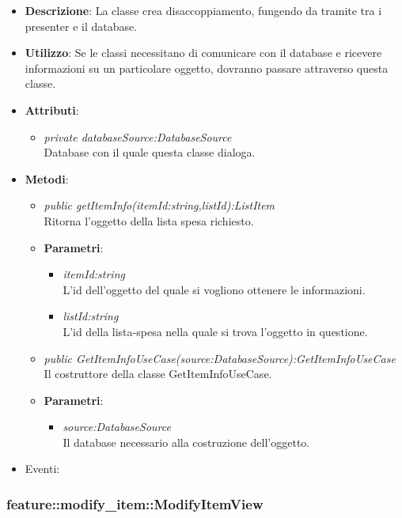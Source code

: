 \begin{itemize}
\item \textbf{Descrizione}: La classe crea disaccoppiamento, fungendo da tramite tra i presenter e il database.
\item \textbf{Utilizzo}: Se le classi necessitano di comunicare con il database e ricevere informazioni su un particolare oggetto, dovranno passare attraverso questa classe.
\item \textbf{Attributi}: 
	\begin{itemize}
	\item \textit{private databaseSource:DatabaseSource}\\
	Database con il quale questa classe dialoga.
	\end{itemize}
\item \textbf{Metodi}:
	\begin{itemize}
	\item \textit{public getItemInfo(itemId:string,listId):ListItem}\\
	Ritorna l'oggetto della lista spesa richiesto.
			\item{\textbf{Parametri}: \begin{itemize}
			\item \textit{itemId:string}\\
			L'id dell'oggetto del quale si vogliono ottenere le informazioni.
			\item \textit{listId:string}\\
			L'id della lista-spesa nella quale si trova l'oggetto in questione.
			\end{itemize}}
			\item \textit{public GetItemInfoUseCase(source:DatabaseSource):GetItemInfoUseCase}\\
			Il costruttore della classe GetItemInfoUseCase.
				\item{\textbf{Parametri}: \begin{itemize}
				\item \textit{source:DatabaseSource}\\
				Il database necessario alla costruzione dell'oggetto.
			\end{itemize}}
	\end{itemize}
\item{Eventi}:
\end{itemize}

\subsubsection{feature::modify\_item::ModifyItemView}

